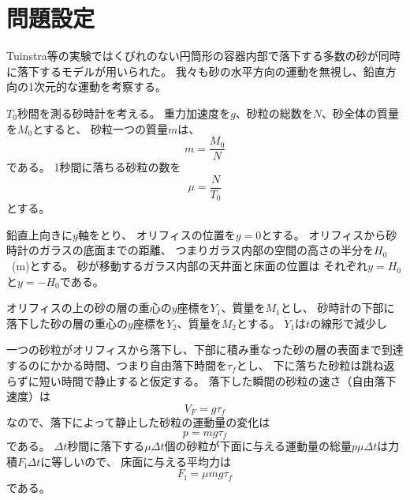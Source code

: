 \documentclass[]{article}
\begin{document}
\section{問題設定}

Tuinstra等の実験ではくびれのない円筒形の容器内部で落下する多数の砂が同時に落下するモデルが用いられた\cite{Tuinstra2010-wk}。
我々も砂の水平方向の運動を無視し、鉛直方向の1次元的な運動を考察する。


$T_0$秒間を測る砂時計を考える。
重力加速度を$g$、砂粒の総数を$N$、砂全体の質量を$M_0$とすると、
砂粒一つの質量$m$は、
\begin{equation} \label{250517100232} 
   m = \frac{M_0}{N} 
\end{equation}
である。
1秒間に落ちる砂粒の数を
\begin{equation} \label{250515082817} 
   \mu = \frac{N}{T_0}
\end{equation}
とする。


鉛直上向きに$y$軸をとり、
オリフィスの位置を$y=0$とする。
オリフィスから砂時計のガラスの底面までの距離、
つまりガラス内部の空間の高さの半分を$H_0$~(\si{m})とする。
砂が移動するガラス内部の天井面と床面の位置は
それぞれ$y=H_0$と$y=-H_0$である。


オリフィスの上の砂の層の重心の$y$座標を$Y_1$、質量を$M_1$とし、
砂時計の下部に落下した砂の層の重心の$y$座標を$Y_2$、質量を$M_2$とする。
$\dot{Y}_1$は$t$の線形で減少し



一つの砂粒がオリフィスから落下し、下部に積み重なった砂の層の表面まで到達するのにかかる時間、つまり自由落下時間を$\tau_f$とし、
下に落ちた砂粒は跳ね返らずに短い時間で静止すると仮定する。
落下した瞬間の砂粒の速さ（自由落下速度）は
\begin{equation} \label{250512190520} 
   V_F = g\tau_f
\end{equation}
なので、落下によって静止した砂粒の運動量の変化は
\begin{equation} \label{250512190655} 
   p = mg\tau_f
\end{equation}
である。
$\Delta t$秒間に落下する$\mu \Delta t$個の砂粒が下面に与える運動量の総量$p\mu \Delta t$は力積$F_\mathrm{i} \Delta t$に等しいので、
床面に与える平均力は
\begin{equation} \label{250515093535} 
  F_\mathrm{i}   = \mu m g \tau_f
\end{equation}
である。
\end{document}
